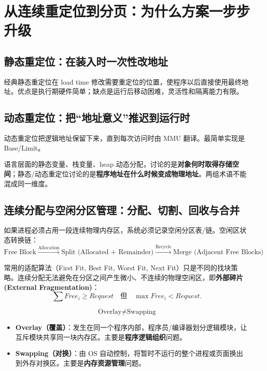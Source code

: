 \documentclass[11pt,a4paper]{ctexart}
\newcommand{\kw}[1]{\textbf{#1}}
\begin{document}
\section{从连续重定位到分页：为什么方案一步步升级}

\subsection{静态重定位：在装入时一次性改地址}
经典静态重定位在 load time 修改需要重定位的位置，使程序以后直接使用最终地址。优点是执行期硬件简单；缺点是运行后移动困难，灵活性和隔离能力有限。

\subsection{动态重定位：把“地址意义”推迟到运行时}
动态重定位把逻辑地址保留下来，直到每次访问时由 MMU 翻译。最简单实现是 Base/Limit。

\begin{exam}
语言层面的静态变量、栈变量、heap 动态分配，讨论的是\kw{对象何时取得存储空间}；静态/动态重定位讨论的是\kw{程序地址在什么时候变成物理地址}。两组术语不能混成同一维度。
\end{exam}

\subsection{连续分配与空闲分区管理：分配、切割、回收与合并}

如果进程必须占用一段连续物理内存区，系统必须记录空闲分区表/链。空闲区状态转换链：
\[
\boxed{
\text{Free Block}
\xrightarrow{\text{Allocation}}
\text{Split (Allocated + Remainder)}
\xrightarrow{\text{Recycle}}
\text{Merge (Adjacent Free Blocks)}
}
\]

常用的适配算法（First Fit, Best Fit, Worst Fit, Next Fit）只是不同的找块策略。连续分配无法避免在分区之间产生微小、不连续的物理空闲区，即\kw{外部碎片 (External Fragmentation)}：
\[
\sum Free_i \ge Request \quad\text{但}\quad \max Free_i < Request.
\]

\begin{method}
\[
\boxed{\text{Overlay} \neq \text{Swapping}}
\]
\begin{itemize}
  \item \kw{Overlay（覆盖）}：发生在同一个程序内部，程序员/编译器划分逻辑模块，让互斥模块共享同一块内存区。主要是\kw{程序逻辑组织}问题。
  \item \kw{Swapping（对换）}：由 OS 自动控制，将暂时不运行的整个进程或页面换出到外存对换区。主要是\kw{内存资源管理}问题。
\end{itemize}
\end{method}
\end{document}
